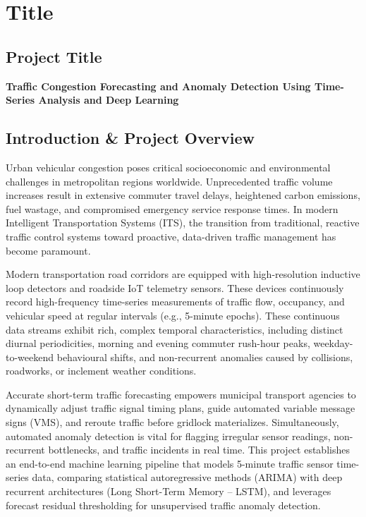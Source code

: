 \documentclass[12pt,a4paper]{article}
\begin{document}
\tableofcontents
\newpage

\listoftables
\vspace{1cm}
\listoffigures
\newpage

\setcounter{page}{1}

\section{Title}
\subsection{Project Title}
\textbf{Traffic Congestion Forecasting and Anomaly Detection Using Time-Series Analysis and Deep Learning}

\subsection{Introduction \& Project Overview}
Urban vehicular congestion poses critical socioeconomic and environmental challenges in metropolitan regions worldwide. Unprecedented traffic volume increases result in extensive commuter travel delays, heightened carbon emissions, fuel wastage, and compromised emergency service response times. In modern Intelligent Transportation Systems (ITS), the transition from traditional, reactive traffic control systems toward proactive, data-driven traffic management has become paramount.

Modern transportation road corridors are equipped with high-resolution inductive loop detectors and roadside IoT telemetry sensors. These devices continuously record high-frequency time-series measurements of traffic flow, occupancy, and vehicular speed at regular intervals (e.g., 5-minute epochs). These continuous data streams exhibit rich, complex temporal characteristics, including distinct diurnal periodicities, morning and evening commuter rush-hour peaks, weekday-to-weekend behavioural shifts, and non-recurrent anomalies caused by collisions, roadworks, or inclement weather conditions.

Accurate short-term traffic forecasting empowers municipal transport agencies to dynamically adjust traffic signal timing plans, guide automated variable message signs (VMS), and reroute traffic before gridlock materializes. Simultaneously, automated anomaly detection is vital for flagging irregular sensor readings, non-recurrent bottlenecks, and traffic incidents in real time. This project establishes an end-to-end machine learning pipeline that models 5-minute traffic sensor time-series data, comparing statistical autoregressive methods (ARIMA) with deep recurrent architectures (Long Short-Term Memory -- LSTM), and leverages forecast residual thresholding for unsupervised traffic anomaly detection.
\end{document}
